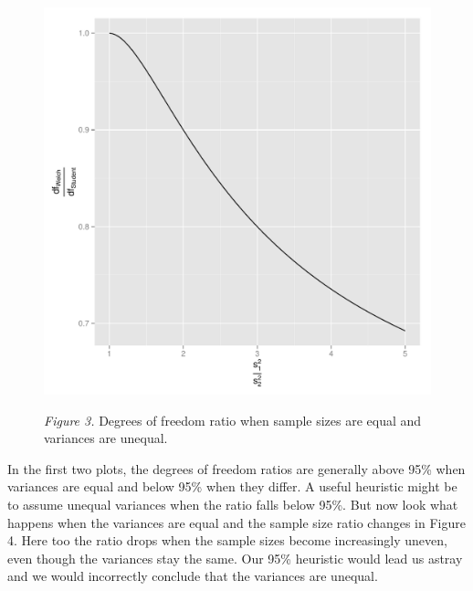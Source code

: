 \documentclass[man,a4paper,noextraspace,apacite]{apa6}\usepackage[]{graphicx}\usepackage[]{color}
\makeatletter
\def\maxwidth{ %
  \ifdim\Gin@nat@width>\linewidth
    \linewidth
  \else
    \Gin@nat@width
  \fi
}
\newenvironment{knitrout}{}{} %
\makeatother
\begin{document}
\begin{figure}
\begin{knitrout}
\color{fgcolor}
\includegraphics[width=\maxwidth]{figure/dfratiosDiffvars} 

\end{knitrout}
\textit{Figure 3.} Degrees of freedom ratio when sample sizes are equal and variances are unequal.
\end{figure}

    In the first two plots, the degrees of freedom ratios are generally above 95\% when variances are equal and below 95\% when they differ. A useful heuristic might be to assume unequal variances when the ratio falls below 95\%. But now look what happens when the variances are equal and the sample size ratio changes in Figure 4. Here too the ratio drops when the sample sizes become increasingly uneven, even though the variances stay the same. Our 95\% heuristic would lead us astray and we would incorrectly conclude that the variances are unequal.
\end{document}
